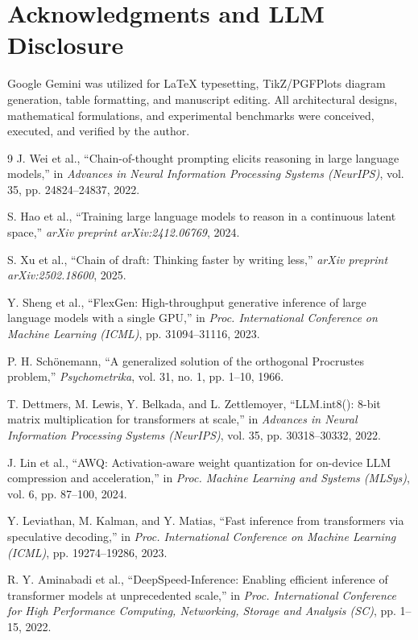 \documentclass[10pt,twocolumn]{article}
\begin{document}
\section*{Acknowledgments and LLM Disclosure}
Google Gemini was utilized for LaTeX typesetting, TikZ/PGFPlots diagram generation, table formatting, and manuscript editing. All architectural designs, mathematical formulations, and experimental benchmarks were conceived, executed, and verified by the author.

\begin{thebibliography}{9}
\enlargethispage{2.0\baselineskip}
\small
\setlength{\itemsep}{0.8pt}
J. Wei et al., ``Chain-of-thought prompting elicits reasoning in large language models,'' in \emph{Advances in Neural Information Processing Systems (NeurIPS)}, vol. 35, pp. 24824--24837, 2022.

S. Hao et al., ``Training large language models to reason in a continuous latent space,'' \emph{arXiv preprint arXiv:2412.06769}, 2024.

S. Xu et al., ``Chain of draft: Thinking faster by writing less,'' \emph{arXiv preprint arXiv:2502.18600}, 2025.

Y. Sheng et al., ``FlexGen: High-throughput generative inference of large language models with a single GPU,'' in \emph{Proc. International Conference on Machine Learning (ICML)}, pp. 31094--31116, 2023.

P. H. Sch{\"o}nemann, ``A generalized solution of the orthogonal Procrustes problem,'' \emph{Psychometrika}, vol. 31, no. 1, pp. 1--10, 1966.

T. Dettmers, M. Lewis, Y. Belkada, and L. Zettlemoyer, ``LLM.int8(): 8-bit matrix multiplication for transformers at scale,'' in \emph{Advances in Neural Information Processing Systems (NeurIPS)}, vol. 35, pp. 30318--30332, 2022.

J. Lin et al., ``AWQ: Activation-aware weight quantization for on-device LLM compression and acceleration,'' in \emph{Proc. Machine Learning and Systems (MLSys)}, vol. 6, pp. 87--100, 2024.

Y. Leviathan, M. Kalman, and Y. Matias, ``Fast inference from transformers via speculative decoding,'' in \emph{Proc. International Conference on Machine Learning (ICML)}, pp. 19274--19286, 2023.

R. Y. Aminabadi et al., ``DeepSpeed-Inference: Enabling efficient inference of transformer models at unprecedented scale,'' in \emph{Proc. International Conference for High Performance Computing, Networking, Storage and Analysis (SC)}, pp. 1--15, 2022.
\end{thebibliography}
\end{document}
